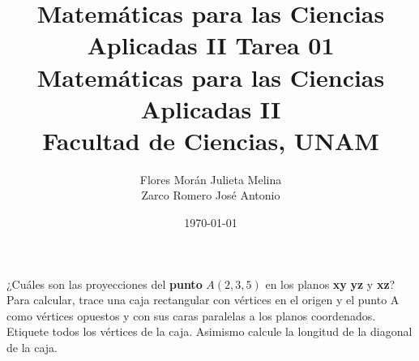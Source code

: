 \documentclass[12pt]{article}
\title{Matemáticas para las Ciencias Aplicadas II}
\title{
	\textbf{Tarea 01} \\
	\vspace{1ex}
	\large Matemáticas para las Ciencias Aplicadas II \\
	Facultad de Ciencias, UNAM}
\date{\today}
\author{Flores Morán Julieta Melina \\ Zarco Romero José Antonio}
\begin{document}
\maketitle

\section{}

¿Cuáles son las proyecciones del \textbf{punto} $A(2,3,5)$ en los planos \textbf{xy} \textbf{yz} y \textbf{xz}? Para calcular, trace una caja rectangular con vértices en el origen y el punto A como vértices opuestos y con sus caras paralelas a los planos coordenados. Etiquete todos los vértices de la caja. Asimismo calcule la longitud de la diagonal de la caja.\\
\end{document}
